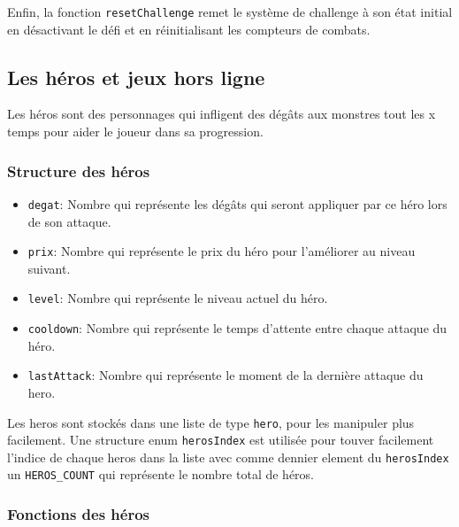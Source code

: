 \documentclass[11pt,a4paper]{article}
\begin{document}
Enfin, la fonction \texttt{resetChallenge} remet le système de challenge à son état initial en désactivant le défi et en réinitialisant les compteurs de combats.

\subsection {Les héros et jeux hors ligne}
Les héros sont des personnages qui infligent des dégâts 
aux monstres tout les x temps pour aider le joueur dans sa progression.

\subsubsection{Structure des héros}

\begin{itemize}
    \item \texttt{degat}: Nombre qui représente les dégâts qui seront appliquer par ce héro lors de son attaque.
    \item \texttt{prix}: Nombre qui représente le prix du héro pour l'améliorer au niveau suivant.
    \item \texttt{level}: Nombre qui représente le niveau actuel du héro.
    \item \texttt{cooldown}: Nombre qui représente le temps d'attente entre chaque attaque du héro.
    \item \texttt{lastAttack}: Nombre qui représente le moment de la dernière attaque du hero.
\end{itemize}

Les heros sont stockés dans une liste de type \texttt{hero}, pour les manipuler plus facilement. Une structure enum \texttt{herosIndex} est 
utilisée pour touver facilement l'indice de chaque heros dans la liste avec comme dennier element du \texttt{herosIndex} 
un \texttt{HEROS\_COUNT} qui représente le nombre total de héros.

\subsubsection{Fonctions des héros}
\end{document}
